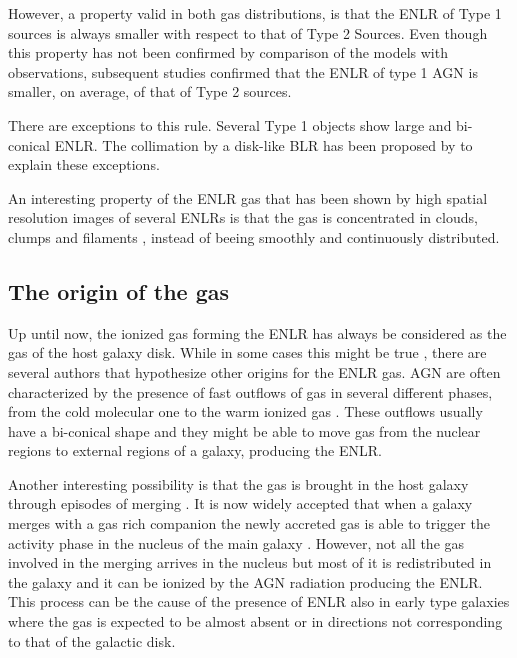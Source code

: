 \documentclass[../main.tex]{subfiles}
\begin{document}
However, a property valid in both gas distributions, is that the ENLR of Type 1 sources is always smaller with respect to that of Type 2 Sources.
Even though this property has not been confirmed by \citet{Mulchaey96b} comparison of the models with observations, subsequent studies \citep[e.g.][]{Schmitt03b} confirmed that the ENLR of type 1 AGN is smaller, on average, of that of Type 2 sources.

There are exceptions to this rule.
Several Type 1 objects \citep[e.g. NGC 4151][]{Pogge89,Evans93} show large and bi-conical ENLR.
The collimation by a disk-like BLR has been proposed by \citet{Evans93} to explain these exceptions.

An interesting property of the ENLR gas that has been shown by high spatial resolution images of several ENLRs is that the gas is concentrated in clouds, clumps and filaments \citep[e.g.][]{Tadhunter89,Mulchaey96a,Mulchaey96b,Schmitt03,Schmitt03b}, instead of beeing smoothly and continuously distributed.

\subsection{The origin of the gas}

Up until now, the ionized gas forming the ENLR has always be considered as the gas of the host galaxy disk.
While in some cases this might be true \citep[e.g.][]{Fischer17}, there are several authors that hypothesize other origins for the ENLR gas.
AGN are often characterized by the presence of fast outflows of gas in several different phases, from the cold molecular one to the warm ionized gas \citep{Baldwin87,Hutchings98,Crenshaw00,Crenshaw00b,Dasyra15,Morganti15,Morganti18}.
These outflows usually have a bi-conical shape \citep{Pogge88,Schmitt94,Fischer13} and they might be able to move gas from the nuclear regions to external regions of a galaxy, producing the ENLR.

Another interesting possibility is that the gas is brought in the host galaxy through episodes of merging \citep{Veilleux99,Ciroi05,DiMille07,Cracco11}.
It is now widely accepted that when a galaxy merges with a gas rich companion the newly accreted gas is able to trigger the activity phase in the nucleus of the main galaxy \citep{Sanders88,Hong15}.
However, not all the gas involved in the merging arrives in the nucleus but most of it is redistributed in the galaxy and it can be ionized by the AGN radiation producing the ENLR.
This process can be the cause of the presence of ENLR also in early type galaxies where the gas is expected to be almost absent or in directions not corresponding to that of the galactic disk.
\end{document}
